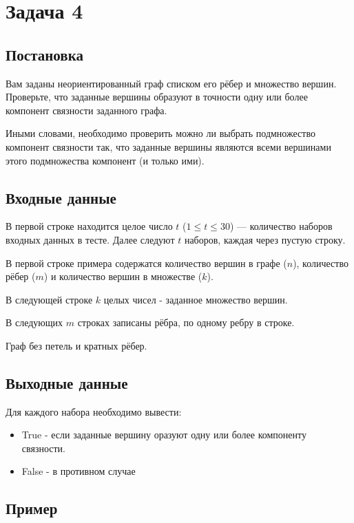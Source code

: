 \documentclass{extarticle}
\begin{document}
\pagebreak
\section*{Задача 4}
\label{sec:org1c43528}
\subsection*{Постановка}
\label{sec:orgf9032bf}

Вам заданы неориентированный граф списком его рёбер и множество вершин. Проверьте, что заданные вершины образуют в точности одну или более компонент связности заданного графа.

Иными словами, необходимо проверить можно ли выбрать подмножество компонент связности так, что заданные вершины являются всеми вершинами этого подмножества компонент (и только ими).

\subsection*{Входные данные}
\label{sec:org8bfa450}

В первой строке находится целое число \(t\)
(\(1 \leq t \leq 30\)) — количество наборов
входных данных в тесте.
Далее следуют \(t\) наборов, каждая через пустую строку.

В первой строке примера содержатся количество вершин в графе (\(n\)),
количество рёбер (\(m\)) и количество вершин в множестве (\(k\)).

В следующей строке \(k\) целых чисел - заданное множество вершин.

В следующих \(m\) строках записаны рёбра, по одному ребру в строке.

Граф без петель и кратных рёбер.

\subsection*{Выходные данные}
\label{sec:orgffd6625}

Для каждого набора необходимо вывести:
\begin{itemize}
\item True - если заданные вершину оразуют одну или более компоненту связности.
\item False - в противном случае
\end{itemize}

\subsection*{Пример}
\label{sec:org388f60f}
\end{document}
